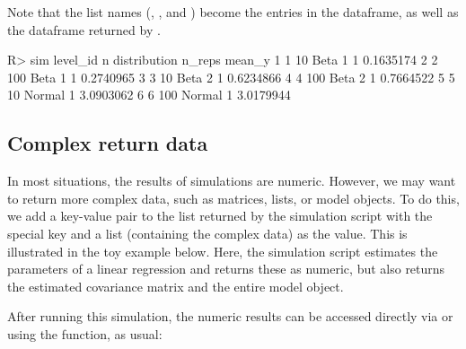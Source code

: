 Note that the list names (, , and ) become the entries in the  dataframe, as well as the dataframe returned by .

\begin{example}
R> sim %
  level_id   n distribution n_reps    mean_y
1        1  10       Beta 1      1 0.1635174
2        2 100       Beta 1      1 0.2740965
3        3  10       Beta 2      1 0.6234866
4        4 100       Beta 2      1 0.7664522
5        5  10       Normal      1 3.0903062
6        6 100       Normal      1 3.0179944
\end{example}

\subsection{Complex return data}\label{ssec_complex}

In most situations, the results of simulations are numeric. However, we may want to return more complex data, such as matrices, lists, or model objects. To do this, we add a key-value pair to the list returned by the simulation script with the special key  and a list (containing the complex data) as the value. This is illustrated in the toy example below. Here, the simulation script estimates the parameters of a linear regression and returns these as numeric, but also returns the estimated covariance matrix and the entire model object.


After running this simulation, the numeric results can be accessed directly via  or using the  function, as usual:

